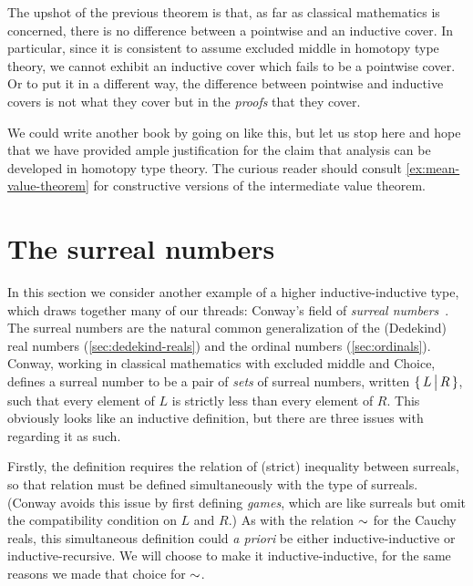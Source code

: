 The upshot of the previous theorem is that, as far as classical mathematics is concerned,
there is no difference between a pointwise and an inductive cover. In particular, since it
is consistent to assume excluded middle in homotopy type theory, we cannot exhibit an
inductive cover which fails to be a pointwise cover. Or to put it in a different way, the
difference between pointwise and inductive covers is not what they cover but in the
\emph{proofs} that they cover.

We could write another book by going on like this, but let us stop here and hope that we
have provided ample justification for the claim that analysis can be developed in homotopy
type theory. The curious reader should consult \cref{ex:mean-value-theorem} for
constructive versions of the intermediate value theorem.


%
%

\section{The surreal numbers}
\label{sec:surreals}

%

In this section we consider another example of a higher inductive-in\-duc\-tive type, which draws together many of our threads: Conway's field \NO of \emph{surreal numbers}~\cite{conway:onag}.
The surreal numbers are the natural common generalization of the (Dedekind) real numbers (\cref{sec:dedekind-reals}) and the ordinal numbers (\cref{sec:ordinals}).
Conway, working in classical mathematics with excluded middle and Choice, defines a surreal number to be a pair of \emph{sets} of surreal numbers, written $\{\,L\,\big|\,R\,\}$, such that every element of $L$ is strictly less than every element of $R$.
This obviously looks like an inductive definition, but there are three issues with regarding it as such.

Firstly, the definition requires the relation of (strict) inequality between surreals, so that relation must be defined simultaneously with the type \NO of surreals.
(Conway avoids this issue by first defining \emph{games}, which are like surreals but omit the compatibility condition on $L$ and $R$.)
As with the relation $\mathord\sim$ for the Cauchy reals, this simultaneous definition could \emph{a priori} be either inductive-inductive or inductive-recursive.
We will choose to make it inductive-inductive, for the same reasons we made that choice for $\mathord\sim$.

